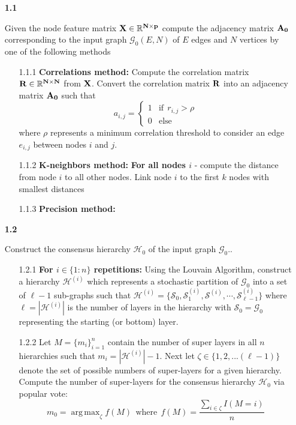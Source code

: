\documentclass[18pt]{article}
\DeclareMathOperator*{\argmax}{arg\,max}
\begin{document}
	\begin{itemize}
		\item[\bf 1.1]{Given the node feature matrix $\bf X \in \mathbb{R}^{N \times p}$ compute the adjacency matrix $\bf A_0$ corresponding to the input graph $\mathcal{G}_0(E, N)$ of $E$ edges and $N$ vertices by one of the following methods
		\begin{itemize}
			\item[1.1.1]{\textbf{Correlations method:} Compute the correlation matrix $\bf R\in\mathbb{R}^{N\times N}$ from $\bf X$. Convert the correlation matrix $\bf R$ into an adjacency matrix $\bf A_0$ such that 
				\[ a_{i,j} = \begin{cases}
					1 & \text{if} \ \  r_{i,j} > \rho \\
					0 & \text{else}
				\end{cases} \] 
			where $\rho$ represents a minimum correlation threshold to consider an edge $e_{i,j}$ between nodes $i$ and $j$.}
			
			\item[1.1.2]{\textbf{K-neighbors method:} {\bf For all nodes $i$} - compute the distance from node $i$ to all other nodes. Link node $i$ to the first $k$ nodes with smallest distances}
			
			\item[1.1.3]{\textbf{Precision method:}}
		\end{itemize} }
	
	\item[\bf 1.2]{Construct the consensus hierarchy $\mathcal{H}_0$ of the input graph $\mathcal{G}_0$..
		
		\begin{itemize}
			\item[1.2.1]{\textbf{For $i \in \{1:n\}$ repetitions:} Using the Louvain Algorithm, construct a hierarchy $\mathcal{H}^{(i)}$ which represents a stochastic partition of $\mathcal{G}_0$ into a set of $\ell-1$ sub-graphs such that $\mathcal{H}^{(i)} = \{\mathcal{S}_0, \mathcal{S}_1^{(i)}, \mathcal{S}^{(i)},\cdots , \mathcal{S}_{\ell-1}^{(i)}\}$ where $\ell = |\mathcal{H}^{(i)}|$ is the number of layers in the hierarchy with $\mathcal{S}_0 = \mathcal{G}_0$ representing the starting (or bottom) layer.}
			
			\item[1.2.2] {Let $M = \{m_i\}_{i=1}^n$ contain the number of super layers in all $n$ hierarchies such that $m_i = |\mathcal{H}^{(i)}| - 1$. Next let $\zeta \in \{1, 2, ... (\ell - 1)\}$ denote the set of possible numbers of super-layers for a given hierarchy. Compute the number of super-layers for the consensus hierarchy $\mathcal{H}_0$ via popular vote:
			\[ m_0 = \argmax_{\zeta} f(M) \ \ \text{where} \ \ f(M) = \frac{\sum_{i \in \zeta} I(M = i)}{n} \]
			}
			

\end{itemize}}
\end{itemize}
\end{document}
